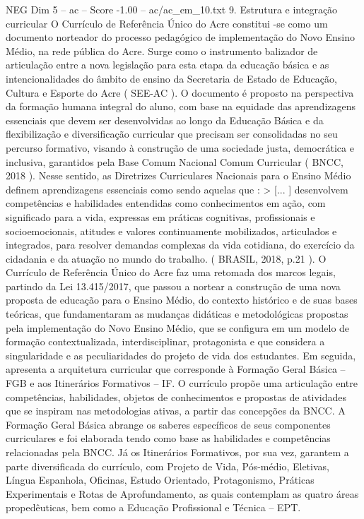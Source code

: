 \begin{textsample}{NEG Dim 5 – ac – Score -1.00 – ac/ac\_em\_10.txt}  \label{ex:f5_neg_167}
9.
Estrutura e integração curricular O Currículo de Referência Único do Acre constitui -se como um documento norteador do processo pedagógico de implementação do Novo Ensino Médio, na rede pública do Acre.
Surge como o instrumento balizador de articulação entre a nova legislação para esta etapa da educação básica e as intencionalidades do âmbito de ensino da Secretaria de Estado de Educação, Cultura e Esporte do Acre ( SEE-AC ).
O documento é proposto na perspectiva da formação humana integral do aluno, com base na equidade das aprendizagens essenciais que devem ser desenvolvidas ao longo da Educação Básica e da flexibilização e diversificação curricular que precisam ser consolidadas no seu percurso formativo, visando à construção de uma sociedade justa, democrática e inclusiva, garantidos pela Base Comum Nacional Comum Curricular ( BNCC, 2018 ).
Nesse sentido, as Diretrizes Curriculares Nacionais para o Ensino Médio definem aprendizagens essenciais como sendo aquelas que : > [... ] desenvolvem competências e habilidades entendidas como conhecimentos em ação, com significado para a vida, expressas em práticas cognitivas, profissionais e socioemocionais, atitudes e valores continuamente mobilizados, articulados e integrados, para resolver demandas complexas da vida cotidiana, do exercício da cidadania e da atuação no mundo do trabalho. ( BRASIL, 2018, p.21 ).
O Currículo de Referência Único do Acre faz uma retomada dos marcos legais, partindo da Lei 13.415/2017, que passou a nortear a construção de uma nova proposta de educação para o Ensino Médio, do contexto histórico e de suas bases teóricas, que fundamentaram as mudanças didáticas e metodológicas propostas pela implementação do Novo Ensino Médio, que se configura em um modelo de formação contextualizada, interdisciplinar, protagonista e que considera a singularidade e as peculiaridades do projeto de vida dos estudantes.
Em seguida, apresenta a arquitetura curricular que corresponde à Formação Geral Básica – FGB e aos Itinerários Formativos – IF.
O currículo propõe uma articulação entre competências, habilidades, objetos de conhecimentos e propostas de atividades que se inspiram nas metodologias ativas, a partir das concepções da BNCC.
A Formação Geral Básica abrange os saberes específicos de seus componentes curriculares e foi elaborada tendo como base as habilidades e competências relacionadas pela BNCC.
Já os Itinerários Formativos, por sua vez, garantem a parte diversificada do currículo, com Projeto de Vida, Pós-médio, Eletivas, Língua Espanhola, Oficinas, Estudo Orientado, Protagonismo, Práticas Experimentais e Rotas de Aprofundamento, as quais contemplam as quatro áreas propedêuticas, bem como a Educação Profissional e Técnica – EPT.

\end{textsample}
